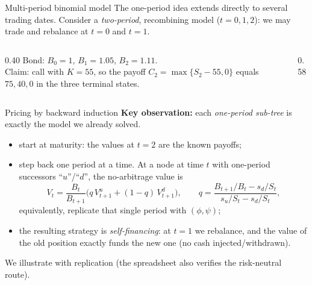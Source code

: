 \documentclass[pdf, handout]{beamer}
\begin{document}
\begin{frame}{Multi-period binomial model}
The one-period idea extends directly to several trading dates. Consider a \emph{two-period}, recombining model ($t=0,1,2$): we may trade and rebalance at $t=0$ and $t=1$.
\begin{columns}[c]
\begin{column}{0.40\textwidth}
\footnotesize
Bond: $B_0=1$, $B_1=1.05$, $B_2=1.11$.\\[2pt]
Claim: call with $K=55$, so the payoff $C_2=\max\{S_2-55,0\}$ equals $75,40,0$ in the three terminal states.
\end{column}
\begin{column}{0.58\textwidth}
\centering
{}
\end{column}
\end{columns}
\end{frame}

\begin{frame}{Pricing by backward induction}
\textbf{Key observation:} each \emph{one-period sub-tree} is exactly the model we already solved.
\begin{itemize}
\item start at maturity: the values at $t=2$ are the known payoffs;
\item step back one period at a time. At a node at time $t$ with one-period successors ``$u$''/``$d$'', the no-arbitrage value is
\[
V_t=\frac{B_t}{B_{t+1}}\Big(q\,V_{t+1}^{u}+(1-q)\,V_{t+1}^{d}\Big),\qquad
q=\frac{B_{t+1}/B_t-s_d/S_t}{s_u/S_t-s_d/S_t},
\]
equivalently, replicate that single period with $(\phi,\psi)$;
\item the resulting strategy is \emph{self-financing}: at $t=1$ we rebalance, and the value of the old position exactly funds the new one (no cash injected/withdrawn).
\end{itemize}
We illustrate with replication (the spreadsheet also verifies the risk-neutral route).
\end{frame}
\end{document}
